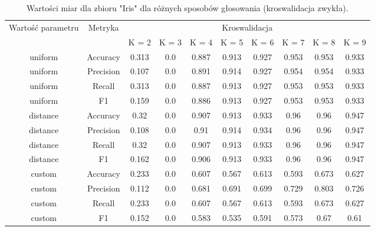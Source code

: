 
\begin{table}[H]
    \begin{tabular}{c|c|cccccccc}
       \multirow{2}{*}{Wartość parametru} & \multirow{2}{*}{Metryka} & \multicolumn{8}{|c|}{Kroswalidacja} \\
         & & K = 2 & K = 3 & K = 4 & K = 5 & K = 6 & K = 7 & K = 8 & K = 9 \\ \hline
         uniform&Accuracy&0.313& 0.0& 0.887& 0.913& 0.927& 0.953& 0.953& 0.933\\ \hline
uniform&Precision&0.107& 0.0& 0.891& 0.914& 0.927& 0.954& 0.954& 0.933\\ \hline
uniform&Recall&0.313& 0.0& 0.887& 0.913& 0.927& 0.953& 0.953& 0.933\\ \hline
uniform&F1&0.159& 0.0& 0.886& 0.913& 0.927& 0.953& 0.953& 0.933\\ \hline
distance&Accuracy&0.32& 0.0& 0.907& 0.913& 0.933& 0.96& 0.96& 0.947\\ \hline
distance&Precision&0.108& 0.0& 0.91& 0.914& 0.934& 0.96& 0.96& 0.947\\ \hline
distance&Recall&0.32& 0.0& 0.907& 0.913& 0.933& 0.96& 0.96& 0.947\\ \hline
distance&F1&0.162& 0.0& 0.906& 0.913& 0.933& 0.96& 0.96& 0.947\\ \hline
custom&Accuracy&0.233& 0.0& 0.607& 0.567& 0.613& 0.593& 0.673& 0.627\\ \hline
custom&Precision&0.112& 0.0& 0.681& 0.691& 0.699& 0.729& 0.803& 0.726\\ \hline
custom&Recall&0.233& 0.0& 0.607& 0.567& 0.613& 0.593& 0.673& 0.627\\ \hline
custom&F1&0.152& 0.0& 0.583& 0.535& 0.591& 0.573& 0.67& 0.61 \\ \hline
    \end{tabular}
    \caption{Wartości miar dla zbioru "Iris" dla różnych sposobów głosowania (kroswalidacja zwykła).}
\end{table}
    